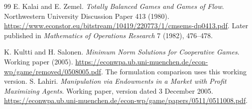 \begin{thebibliography}{99}
E. Kalai and E. Zemel.
\emph{Totally Balanced Games and Games of Flow}.
Northwestern University Discussion Paper 413 (1980).
\url{https://www.econstor.eu/bitstream/10419/220773/1/cmsems-dp0413.pdf}.
Later published in \emph{Mathematics of Operations Research} 7 (1982), 476--478.

K. Kultti and H. Salonen.
\emph{Minimum Norm Solutions for Cooperative Games}.
Working paper (2005).
\url{https://econwpa.ub.uni-muenchen.de/econ-wp/game/removed/0508005.pdf}.
The formulation comparison uses this working version.
S. Lahiri.
\emph{Manipulation via Endowments in a Market with Profit Maximizing Agents}.
Working paper, version dated 3 December 2005.
\url{https://econwpa.ub.uni-muenchen.de/econ-wp/game/papers/0511/0511008.pdf}.
\end{thebibliography}

